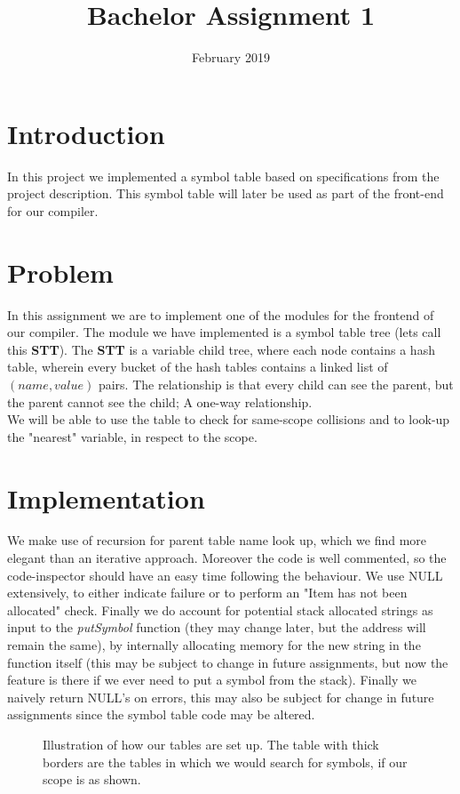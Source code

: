 \documentclass[a4paper]{article}
\title{Bachelor Assignment 1}
\date{February 2019}
\begin{document}
\maketitle

\section{Introduction}
In this project we implemented a symbol table based on specifications from the project description. This symbol table will later be used as part of the front-end for our compiler.

\section{Problem}
In this assignment we are to implement one of the modules for the frontend of our compiler. The module we have implemented is a symbol table tree (lets call this \textbf{STT}).
The \textbf{STT} is a variable child tree, where each node contains a hash table, wherein every bucket of the hash tables contains a linked list of $(name, value)$ pairs.
The relationship is that every child can see the parent, but the parent cannot see the child; A one-way relationship.\\
We will be able to use the table to check for same-scope collisions and to look-up the "nearest" variable, in respect to the scope.

\section{Implementation}
We make use of recursion for parent table name look up, which we find more elegant than an iterative approach.
Moreover the code is well commented, so the code-inspector should have an easy time following the behaviour.
We use NULL extensively, to either indicate failure or to perform an "Item has not been allocated" check.
Finally we do account for potential stack allocated strings as input to the \textit{putSymbol} function (they may change later, but the address will remain the same), by internally allocating memory for the new string in the function itself (this may be subject to change in future assignments, but now the feature is there if we ever need to put a symbol from the stack).
Finally we naively return NULL's on errors, this may also be subject for change in future assignments since the symbol table code may be altered.

\begin{figure}
    \centering
    
    \caption{Illustration of how our tables are set up. The table with thick borders are the tables in which we would search for symbols, if our scope is as shown.}
    \label{fig:symboltable}
\end{figure}
\end{document}
